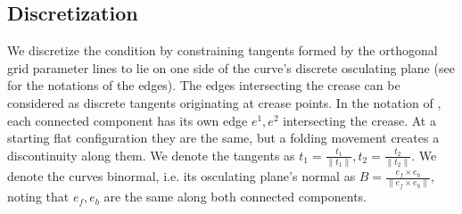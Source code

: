 

\subsection{Discretization}
We discretize the condition by constraining tangents formed by the orthogonal grid parameter lines to lie on one side of the curve's discrete osculating plane (see  for the notations of the edges). The edges intersecting the crease can be considered as discrete tangents originating at crease points. In the notation of , each connected component has its own edge $e^1,e^2$ intersecting the crease. At a starting flat configuration they are the same, but a folding movement creates a discontinuity along them. We denote the tangents as $t_1 = \frac{t_1}{\|t_1\|}, t_2 = \frac{t_2}{\|t_2\|}$. We denote the curves binormal, i.e. its osculating plane's normal as $B = \frac{e_f \times e_b}{\|e_f \times e_b\|}$, noting that $e_f,e_b$ are the same along both connected components.


